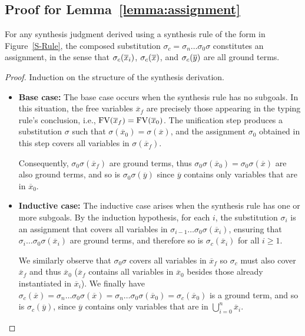 \subsection{Proof for Lemma~\ref{lemma:assignment}}
\label{sec:appendix-lemma2}
\begin{lemma}
For any synthesis judgment derived using a synthesis rule of the form in Figure~\ref{S-Rule}, the composed substitution $\sigma_c = \sigma_n \ldots \sigma_0 \sigma$ constitutes an assignment, in the sense that $\sigma_c(\overline{x}_i)$, $\sigma_c(\overline{x})$, and $\sigma_c(\overline{y})$ are all ground terms.
\end{lemma}
\begin{proof}
Induction on the structure of the synthesis derivation.
\begin{itemize}
 \item \textbf{Base case:} The base case occurs when the synthesis rule has no subgoals. In this situation, the free variables $\overline{x}_f$ are precisely those appearing in the typing rule's conclusion, i.e., $\text{FV}(\overline{x}_f) = \text{FV}(\overline{x}_0)$. The unification step produces a substitution $\sigma$ such that $\sigma(\overline{x}_0) = \sigma(\overline{x})$, and the assignment $\sigma_0$ obtained in this step covers all variables in $\sigma(\overline{x}_f)$. 
 
 Consequently, $\sigma_0\sigma(\overline{x}_f)$ are ground terms, thus $\sigma_0\sigma(\overline{x}_0) = \sigma_0\sigma(\overline{x})$ are also ground terms, and so is $\sigma_0\sigma(\overline{y})$ since $\overline{y}$ contains only variables that are in $\overline{x}_0$.
 
 \item \textbf{Inductive case:} The inductive case arises when the synthesis rule has one or more subgoals. By the induction hypothesis, for each $i$, the substitution $\sigma_i$ is an assignment that covers all variables in $\sigma_{i-1}\ldots\sigma_0\sigma(\overline{x}_i)$, ensuring that $\sigma_{i}\ldots\sigma_0\sigma(\overline{x}_i)$ are ground terms, and therefore so is $\sigma_c(\overline{x}_i)$ for all $i\ge1$.
 
 We similarly observe that $\sigma_0\sigma$ covers all variables in $\overline{x}_f$ so $\sigma_c$ must also cover $\overline{x}_f$ and thus $\overline{x}_0$ ($\overline{x}_f$ contains all variables in $\overline{x}_0$ besides those already instantiated in $\overline{x}_i$). 
 We finally have $\sigma_c(\overline{x}) = \sigma_n \ldots \sigma_0 \sigma(\overline{x}) = \sigma_n \ldots \sigma_0 \sigma(\overline{x}_0) = \sigma_c(\overline{x}_0)$ is a ground term, and so is $\sigma_c(\overline{y})$, since $\overline{y}$ contains only variables that are in $\bigcup_{i=0}^n\overline{x}_i$.
 \end{itemize}
\end{proof}

